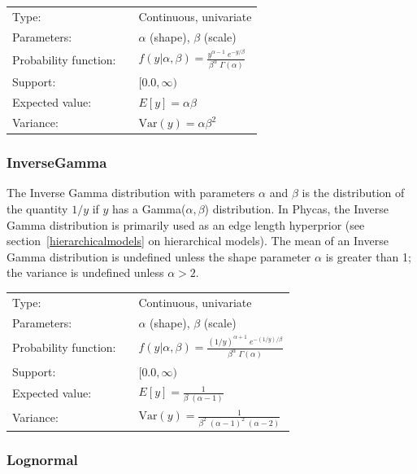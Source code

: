 \documentclass[10pt]{article}
\newcommand{\Var}{\mbox{Var}}
\begin{document}
\begin{tabular}{lcl}
Type:                 & & Continuous, univariate \\
Parameters:           & & $\alpha$ (shape), $\beta$ (scale)    \\
Probability function: & & $f(y|\alpha,\beta) = \frac{y^{\alpha - 1} \; e^{-y/\beta}}{\beta^{\alpha} \; \Gamma(\alpha)}$ \\
Support:              & & $[0.0,\infty)$     \\
Expected value:       & & $E[y] = \alpha \beta$ \\
Variance:             & & $\Var(y) = \alpha \beta^2$ 
\end{tabular}

\subsubsection{InverseGamma}

The Inverse Gamma distribution with parameters $\alpha$ and $\beta$ is the distribution of the quantity $1/y$ if $y$ has a Gamma($\alpha,\beta$) distribution. In Phycas, the Inverse Gamma distribution is primarily used as an edge length hyperprior (see section~\ref{hierarchicalmodels} on hierarchical models). The mean of an Inverse Gamma distribution is undefined unless the shape parameter $\alpha$ is greater than 1; the variance is undefined unless $\alpha > 2$.

\begin{tabular}{lcl}
Type:                 & & Continuous, univariate \\
Parameters:           & & $\alpha$ (shape), $\beta$ (scale)    \\
Probability function: & & $f(y|\alpha,\beta) = \frac{(1/y)^{\alpha + 1} \; e^{-(1/y)/\beta}}{\beta^{\alpha} \; \Gamma(\alpha)}$ \\
Support:              & & $[0.0,\infty)$     \\
Expected value:       & & $E[y] = \frac{1}{\beta \;(\alpha-1)}$ \\
Variance:             & & $\Var(y) = \frac{1}{\beta^2 \; (\alpha-1)^2 \; (\alpha-2)}$ 
\end{tabular}

\subsubsection{Lognormal}
\end{document}

